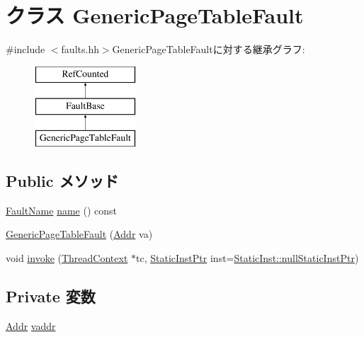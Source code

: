 \hypertarget{classGenericPageTableFault}{
\section{クラス GenericPageTableFault}
\label{classGenericPageTableFault}
}


{\ttfamily \#include $<$faults.hh$>$}GenericPageTableFaultに対する継承グラフ:\begin{figure}[H]
\begin{center}
\leavevmode
\includegraphics[height=3cm]{classGenericPageTableFault}
\end{center}
\end{figure}
\subsection*{Public メソッド}
\begin{DoxyCompactItemize}
\item 
\hyperlink{sim_2faults_8hh_abb196df64725e5c2568c900cf130d8d7}{FaultName} \hyperlink{classGenericPageTableFault_a73adb23259baf912a81683a9790a303f}{name} () const 
\item 
\hyperlink{classGenericPageTableFault_ab826e9f22292069df6ccf4b5d48874c2}{GenericPageTableFault} (\hyperlink{base_2types_8hh_af1bb03d6a4ee096394a6749f0a169232}{Addr} va)
\item 
void \hyperlink{classGenericPageTableFault_a2bd783b42262278d41157d428e1f8d6f}{invoke} (\hyperlink{classThreadContext}{ThreadContext} $\ast$tc, \hyperlink{classRefCountingPtr}{StaticInstPtr} inst=\hyperlink{classStaticInst_aa793d9793af735f09096369fb17567b6}{StaticInst::nullStaticInstPtr})
\end{DoxyCompactItemize}
\subsection*{Private 変数}
\begin{DoxyCompactItemize}
\item 
\hyperlink{base_2types_8hh_af1bb03d6a4ee096394a6749f0a169232}{Addr} \hyperlink{classGenericPageTableFault_a9f933b300ef63eea367ca82f8da31025}{vaddr}
\end{DoxyCompactItemize}


